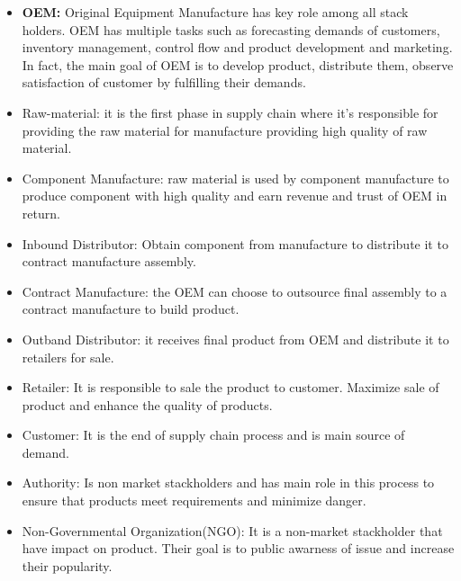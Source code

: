 \begin{itemize}
	\item \textbf{OEM: } Original Equipment Manufacture has key role among all stack holders. OEM has multiple tasks such as forecasting demands of customers, inventory management, control flow and product development and marketing. In fact, the main goal of OEM is to develop product, distribute them, observe satisfaction of customer by fulfilling their demands.\\
	\item Raw-material: it is the first phase in supply chain where it's responsible for providing the raw material for manufacture providing high quality of raw material.
	\item Component Manufacture: raw material is used by component manufacture to produce component with high quality and earn revenue and trust of OEM in return.
	\item Inbound Distributor: Obtain component from manufacture to distribute it to contract manufacture assembly.
	\item Contract Manufacture: the OEM can choose to outsource final assembly to a contract manufacture to build product.\\ 
	\item Outband Distributor: it receives final product from OEM and distribute it to retailers for sale.
	\item Retailer: It is responsible to sale the product to customer. Maximize sale of product and enhance the quality of products.
	\item Customer: It is the end of supply chain process and is main source of demand.
	\item Authority: Is non market stackholders and has main role in this process to ensure that products meet requirements and minimize danger.
	\item Non-Governmental Organization(NGO): It is a non-market stackholder that have impact on product. Their goal is to public awarness of issue and increase their popularity\cite{Angwei}.  
	
\end{itemize}
